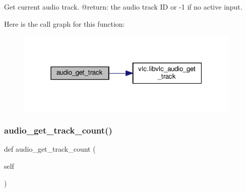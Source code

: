 \begin{DoxyVerb}Get current audio track.
@return: the audio track ID or -1 if no active input.
\end{DoxyVerb}
 Here is the call graph for this function\+:
\nopagebreak
\begin{figure}[H]
\begin{center}
\leavevmode
\includegraphics[width=304pt]{classvlc_1_1_media_player_a7b62c60ce56f76126fc65bf2c573c264_cgraph}
\end{center}
\end{figure}
\mbox{\label{classvlc_1_1_media_player_a47ac925db973be3fef872b44e76f485b}} 
\subsubsection{\texorpdfstring{audio\+\_\+get\+\_\+track\+\_\+count()}{audio\_get\_track\_count()}}
{\footnotesize\ttfamily def audio\+\_\+get\+\_\+track\+\_\+count (\begin{DoxyParamCaption}\item[{}]{self }\end{DoxyParamCaption})}

